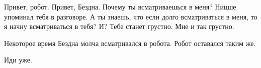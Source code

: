 \begin{dialog}
\X Привет, робот.
\R Привет, Бездна.
\X Почему ты всматриваешься в меня?
\R Ницше упоминал тебя в разговоре.
\X А ты знаешь, что если долго всматриваться в меня, то я начну всматриваться в тебя?
\R И?
\X Тебе станет грустно.
\R Мне и так грустно.
\end{dialog}

\begin{monolog}
Некоторое время Бездна молча всматривался в робота. Робот оставался таким же.
\end{monolog}

\begin{dialog}
\R Иди уже.
\end{dialog}